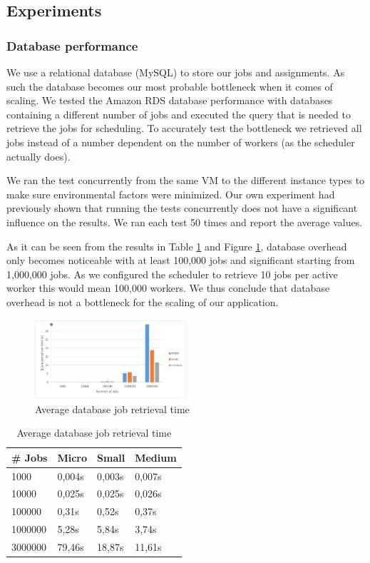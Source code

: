 \documentclass[a4paper]{IEEEtran}
\begin{document}
\subsection{Experiments}

\subsubsection{Database performance}

We use a relational database (MySQL) to store our jobs and assignments. As such the database becomes our most probable bottleneck when it comes of scaling. We tested the Amazon RDS database performance with databases containing a different number of jobs and executed the query that is needed to retrieve the jobs for scheduling. To accurately test the bottleneck we retrieved all jobs instead of a number dependent on the number of workers (as the scheduler actually does).

We ran the test concurrently from the same VM to the different instance types to make sure environmental factors were minimized. Our own experiment had previously shown that running the tests concurrently does not have a significant influence on the results. We ran each test 50 times and report the average values.

As it can be seen from the results in Table \ref{dbperfresults} and Figure \ref{fig_dbperfresults}, database overhead only becomes noticeable with at least 100,000 jobs and significant starting from 1,000,000 jobs. As we configured the scheduler to retrieve 10 jobs per active worker this would mean 100,000 workers. We thus conclude that database overhead is not a bottleneck for the scaling of our application.

\begin{figure}
\centering
\includegraphics[width=0.5\textwidth]{"results-database"}
\caption{Average database job retrieval time}
\label{fig_dbperfresults}
\end{figure}

\begin{table}
\caption{Average database job retrieval time}
\label{dbperfresults}
\centering
\begin{tabular}{| l | l | l | l |}
\hline
\# Jobs & Micro & Small & Medium \\ \hline
1000 & 0,004s &	0,003s & 0,007s \\ \hline
10000 & 0,025s & 0,025s & 0,026s \\ \hline
100000 & 0,31s & 0,52s & 0,37s \\ \hline
1000000 & 5,28s & 5,84s & 3,74s \\ \hline
3000000	& 79,46s & 18,87s & 11,61s \\ \hline
\end{tabular}
\end{table}
\ \\
\end{document}
